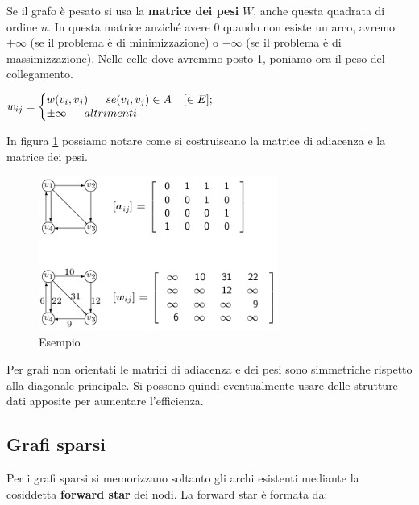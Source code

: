 \documentclass[11pt]{book}
\makeatletter
\newenvironment{sistema}%
{\left\lbrace\begin{array}{@{}l@{}}}%
{\end{array}\right.}
\makeatother
\begin{document}
Se il grafo \`e pesato si usa la {\bf matrice dei pesi} $W$, anche
questa quadrata di ordine $n$. In questa matrice anzich\'e avere 0
quando non esiste un arco, avremo $+\infty$ (se il problema \`e di
minimizzazione) o $-\infty$ (se il problema \`e di
massimizzazione). Nelle celle dove avremmo posto 1, poniamo ora il
peso del collegamento. 

\begin{center}
$w_{ij} = 
\begin{sistema}
w(v_i,v_j)\phantom{aaa} se (v_i, v_j) \in A\phantom{aa}[\in E];\\
\pm\infty \phantom{aaa} altrimenti
\end{sistema}
$
\end{center}

In figura \ref{cap7figura74} possiamo notare come si costruiscano la
matrice di adiacenza e la matrice dei pesi.

\begin{figure}[h!]
  \centering
  \includegraphics[width=0.7\textwidth]{images/cap7figura74.png}
  \caption{Esempio}
  \label{cap7figura74}
\end{figure}

Per grafi non orientati le matrici di adiacenza e dei pesi sono
simmetriche rispetto alla diagonale principale. Si possono quindi
eventualmente usare delle strutture dati apposite per aumentare
l'efficienza.

\subsection{Grafi sparsi}

Per i grafi sparsi si memorizzano soltanto gli archi esistenti
mediante la cosiddetta {\bf forward star} dei nodi. La forward star
\`e formata da:
\end{document}
